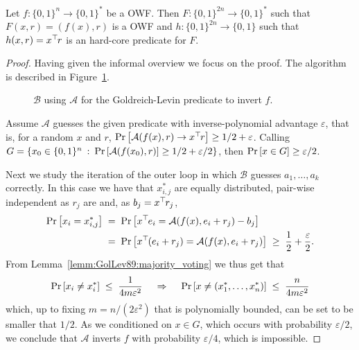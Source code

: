 \begin{theorem}
	\label{theo:GolLev89}
	Let $f : \{0,1\}^n \to \{0,1\}^\ast$ be a OWF.
	Then $F : \{0,1\}^{2n} \to \{0,1\}^\ast$ such that $F(x,r) = (f(x), r)$ is a OWF and $h : \{0,1\}^{2n} \to \{0,1\}$ such that $h(x,r) = x^\top\hspace{-.1em} r$ is an hard-core predicate for $F$.
\end{theorem}
\begin{proof}
	Having given the informal overview we focus on the proof. The algorithm is described in Figure~\ref{prot:GolLev84}.
	
	\begin{figure}[htb]
	\centering
	\label{prot:GolLev84}
	\caption{$\mathcal{B}$ using $\mathcal{A}$ for the Goldreich-Levin predicate to invert $f$.}
	\end{figure}
	
	Assume $\mathcal{A}$ guesses the given predicate with inverse-polynomial advantage $\varepsilon$, that is, for a random $x$ and $r$, $\Pr \left[ \mathcal{A}(f(x), r) \to x^\top\hspace{-.1em} r \right] \geq 1/2 + \varepsilon$.
	Calling $G = \{x_0 \in \{0,1\}^n \: : \: \Pr \left[ \mathcal{A}(f(x_0), r) \right] \geq 1/2 + \varepsilon/2\}$, then $\Pr \left[ x \in G \right] \geq \varepsilon/2$.
	
	Next we study the iteration of the outer loop in which $\mathcal{B}$ guesses $a_1, \ldots, a_k$ correctly.
	In this case we have that $x_{i,j}^\ast$ are equally distributed, pair-wise independent as $r_j$ are and, as $b_j = x^\top\hspace{-.1em} r_j$,
	\begin{align*}
		\Pr \left[ x_i = x^\ast_{i,j} \right]
			\; &= \;
		\Pr \left[ x^\top\hspace{-.1em} e_i = \mathcal{A}(f(x), e_i + r_j) - b_j \right]
			\; \\ &= \;
		\Pr \left[ x^\top\hspace{-.1em} (e_i + r_j) = \mathcal{A}(f(x), e_i + r_j) \right]
			\; \geq \;
		\frac{1}{2} + \frac{\varepsilon}{2}.
	\end{align*}
	From Lemma~\ref{lemm:GolLev89:majority_voting} we thus get that
	\[
		\Pr \left[ x_i \neq x^\ast_i \right]
			\; \leq \;
		\frac{1}{4m \varepsilon^2}
			\quad \: \Rightarrow \: \quad
		\Pr \left[ x \neq (x^\ast_1, \ldots, x^\ast_n) \right]
			\; \leq \;
		\frac{n}{4m \varepsilon^2}
	\]
	which, up to fixing $m = n/(2\varepsilon^2)$ that is polynomially bounded, can be set to be smaller that $1/2$.
	As we conditioned on $x \in G$, which occurs with probability $\varepsilon/2$, we conclude that $\mathcal{A}$ inverts $f$ with probability $\varepsilon/4$, which is impossible.
	

\end{proof}
